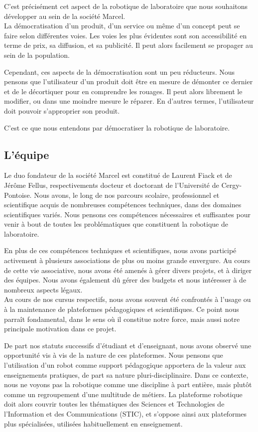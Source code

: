 \documentclass[a4paper,12pt]{report}
\begin{document}
C'est précisément cet aspect de la robotique de laboratoire que nous souhaitons développer au sein de la société Marcel.\\

La démocratisation d'un produit, d'un service ou même d'un concept peut se faire selon différentes voies. 
Les voies les plus évidentes sont son accessibilité en terme de prix, sa diffusion, et sa publicité.
Il peut alors facilement se propager au sein de la population.

Cependant, ces aspects de la démocratisation sont un peu réducteurs.
Nous pensons que l'utilisateur d'un produit doit être en mesure de démonter ce dernier et de le décortiquer pour en comprendre les rouages.
Il peut alors librement le modifier, ou dans une moindre mesure le réparer.
En d'autres termes, l'utilisateur doit pouvoir s'approprier son produit.

C'est ce que nous entendons par \og{}démocratiser la robotique de laboratoire\fg{}.

\subsection{L'équipe}
Le duo fondateur de la société Marcel est constitué de Laurent Fiack et de Jérôme Fellus, respectivements docteur et doctorant de l'Université de Cergy-Pontoise.
Nous avons, le long de nos parcours scolaire, professionnel et scientifique acquis de nombreuses compétences techniques, dans des domaines scientifiques variés. 
Nous pensons ces compétences nécessaires et suffisantes pour venir à bout de toutes les problématiques que constituent la robotique de laboratoire.

En plus de ces compétences techniques et scientifiques, nous avons participé activement à plusieurs associations de plus ou moins grande envergure.
Au cours de cette vie associative, nous avons été amenés à gérer divers projets, et à diriger des équipes.
Nous avons également dû gérer des budgets et nous intéresser à de nombreux aspects légaux.\\

Au cours de nos cursus respectifs, nous avons souvent été confrontés à l'usage ou à la maintenance de plateformes pédagogiques et scientifiques.
Ce point nous parraît fondamental, dans le sens où il constitue notre force, mais aussi notre principale motivation dans ce projet.

De part nos statuts successifs d'étudiant et d'enseignant, nous avons observé une opportunité vis à vis de la nature de ces plateformes.
Nous pensons que l'utilisation d'un robot comme support pédagogique apportera de la valeur aux enseignements pratiques, de part sa nature pluri-disciplinaire.
Dans ce contexte, nous ne voyons pas la robotique comme une discipline à part entière, mais plutôt comme un regroupement d'une multitude de métiers.
La plateforme robotique doit alors couvrir toutes les thématiques des Sciences et Technologies de l'Information et des Communications (STIC),
et s'oppose ainsi aux plateformes plus spécialisées, utilisées habituellement en enseignement.\\
\end{document}
